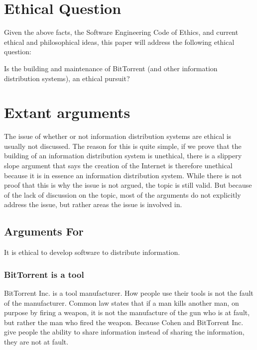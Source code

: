 \documentclass[11pt]{article}
\begin{document}
\section{Ethical Question}

Given the above facts, the Software Engineering Code of Ethics, and current ethical and philosophical ideas, this paper will address the following ethical question:

{\addtolength{\leftskip}{6mm}
Is the building and maintenance of BitTorrent (and other information distribution systems), an ethical pursuit?
}

\section{Extant arguments}

The issue of whether or not information distribution systems are ethical is usually not discussed. The reason for this is quite simple, if we prove that the building of an information distribution system is unethical, there is a slippery slope argument that says the creation of the Internet is therefore unethical because it is in essence an information distribution system. While there is not proof that this is why the issue is not argued, the topic is still valid. But because of the lack of discussion on the topic, most of the arguments do not explicitly address the issue, but rather areas the issue is involved in.

\subsection{Arguments For}

It is ethical to develop software to distribute information.

\subsubsection{BitTorrent is a tool}
BitTorrent Inc. is a tool manufacturer. How people use their tools is not the fault of the manufacturer. Common law states that if a man kills another man, on purpose by firing a weapon, it is not the manufacture of the gun who is at fault, but rather the man who fired the weapon. Because Cohen and BitTorrent Inc. give people the ability to share information instead of sharing the information, they are not at fault.
\end{document}
